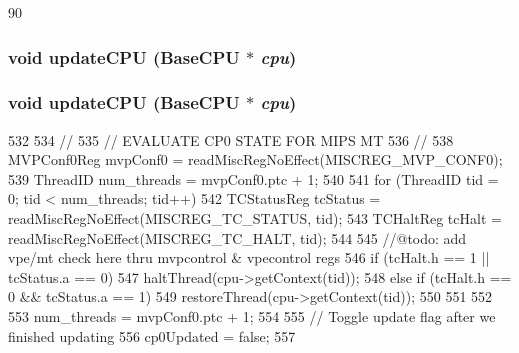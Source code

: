 \begin{DoxyCode}
90 { }
\end{DoxyCode}
\hypertarget{classMipsISA_1_1ISA_a872038d84b4cde793f5f2f7b75df3293}{
\subsubsection[{updateCPU}]{\setlength{\rightskip}{0pt plus 5cm}void updateCPU ({\bf BaseCPU} $\ast$ {\em cpu})}}
\label{classMipsISA_1_1ISA_a872038d84b4cde793f5f2f7b75df3293}
\hypertarget{classMipsISA_1_1ISA_a872038d84b4cde793f5f2f7b75df3293}{
\subsubsection[{updateCPU}]{\setlength{\rightskip}{0pt plus 5cm}void updateCPU ({\bf BaseCPU} $\ast$ {\em cpu})}}
\label{classMipsISA_1_1ISA_a872038d84b4cde793f5f2f7b75df3293}



\begin{DoxyCode}
532 {
534     //
535     // EVALUATE CP0 STATE FOR MIPS MT
536     //
538     MVPConf0Reg mvpConf0 = readMiscRegNoEffect(MISCREG_MVP_CONF0);
539     ThreadID num_threads = mvpConf0.ptc + 1;
540 
541     for (ThreadID tid = 0; tid < num_threads; tid++) {
542         TCStatusReg tcStatus = readMiscRegNoEffect(MISCREG_TC_STATUS, tid);
543         TCHaltReg tcHalt = readMiscRegNoEffect(MISCREG_TC_HALT, tid);
544 
545         //@todo: add vpe/mt check here thru mvpcontrol & vpecontrol regs
546         if (tcHalt.h == 1 || tcStatus.a == 0)  {
547             haltThread(cpu->getContext(tid));
548         } else if (tcHalt.h == 0 && tcStatus.a == 1) {
549             restoreThread(cpu->getContext(tid));
550         }
551     }
552 
553     num_threads = mvpConf0.ptc + 1;
554 
555     // Toggle update flag after we finished updating
556     cp0Updated = false;
557 }
\end{DoxyCode}


